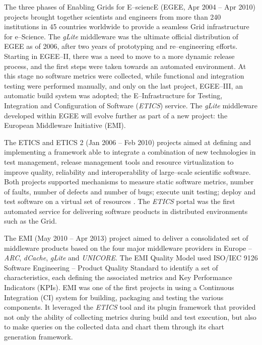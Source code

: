 \documentclass[journal]{IEEEtran}
\begin{document}
The three phases of Enabling Grids for E--sciencE (EGEE, Apr 2004 -- Apr 2010) \cite{cordis:egee, cordis:egee2, cordis:egee3} projects brought together scientists and engineers from more than 240 institutions in 45 countries worldwide to provide a seamless Grid infrastructure for e--Science. The {\sl gLite} middleware \cite{glite} was the ultimate official distribution of EGEE as of 2006, after two years of prototyping and re--engineering efforts.
Starting in EGEE--II, there was a need to move to a more dynamic release process, and the first steps were taken towards an automated environment. At this stage no software metrics were collected, while functional and integration testing were performed manually, and only on the last project, EGEE--III, an automatic build system was adopted; the E--Infrastructure for Testing, Integration and Configuration of Software ({\sl ETICS}) service. The {\sl gLite} middleware developed within EGEE will evolve further as part of a new project: the European Middleware Initiative (EMI).

The ETICS \cite{cordis:etics} and ETICS 2 \cite{cordis:etics2} (Jan 2006 -- Feb 2010) projects aimed at defining and implementing a framework able to integrate a combination of new technologies in test management, release management tools and resource virtualization to improve quality, reliability and interoperability of large--scale scientific software. Both projects supported mechanisms to measure static software metrics, number of faults, number of defects and number of bugs; execute unit testing; deploy and test software on a virtual set of resources \cite{etics}. The {\sl ETICS} portal was the first automated service for delivering software products in distributed environments such as the Grid.

The EMI (May 2010 -- Apr 2013) project \cite{cordis:emi} aimed to deliver a consolidated set of middleware products based on the four major middleware providers in Europe -- {\sl ARC}, {\sl dCache}, {\sl gLite} and {\sl UNICORE}. The EMI Quality Model used ISO/IEC 9126 Software Engineering -- Product Quality Standard \cite{iso9126} to identify a set of characteristics, each defining the associated metrics and Key Performance Indicators (KPIs). EMI was one of the first projects in using a Continuous Integration (CI) system for building, packaging and testing the various components. It leveraged the {\sl ETICS} tool and its plugin framework that provided not only the ability of collecting metrics during build and test execution, but also to make queries on the collected data and chart them through its chart generation framework.
\end{document}
